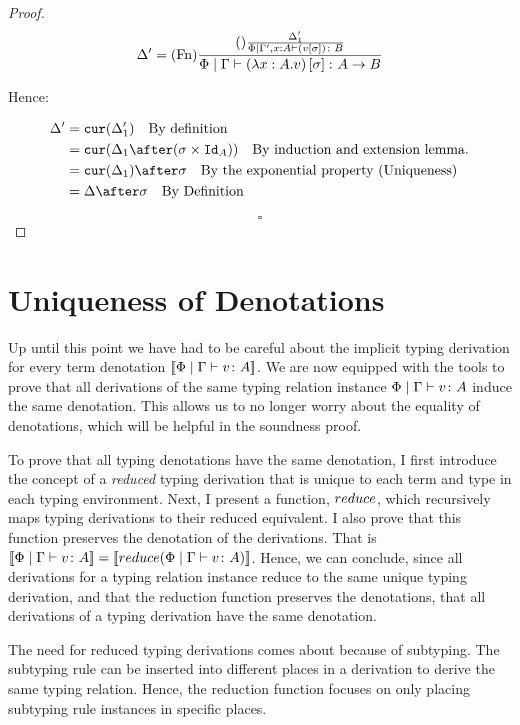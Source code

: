\documentclass{Report}
\begin{document}
\begin{proof}
\begin{equation}\label{TermSubLambdaPrime}
    \Delta' = (\text{Fn}) \frac{
        (\text{}) \frac{\Delta_1'}{\Phi\mid\Gamma', x:A \vdash (v\left[\sigma\right]) \colon B}
    }{\Phi\mid\Gamma \vdash (\lambda x : A. v)\left[\sigma\right] \colon A\rightarrow B}
\end{equation}


Hence:

\begin{align}
    \D' &= \cur{\D_1'}\qt{By definition}\\
        &= \cur{\D_1\after(\si\times\Id{A})}\qt{By induction and extension lemma.}\\
        & = \cur{\D_1}\after\si\qt{By the exponential property (Uniqueness)}\\
        &= \D\after\si\qt{By Definition}\\
\end{align}

$$\square$$
\end{proof}


\section{Uniqueness of Denotations}

Up until this point we have had to be careful about the implicit typing derivation for every term denotation ${\bf [\![}\Phi\mid\Gamma \vdash v \colon A{\bf ]\!]}$. We are now equipped with the tools to prove that all derivations of the same typing relation instance $\Phi\mid\Gamma \vdash v \colon A$ induce the same denotation. This allows us to no longer worry about the equality of denotations, which will be helpful in the soundness proof.

To prove that all typing denotations have the same denotation, I first introduce the concept of a \textit{reduced} typing derivation that is unique to each term and type in each typing environment. Next, I present a function, $reduce$, which recursively maps  typing derivations to their reduced equivalent. I also prove that this function preserves the denotation of the derivations. That is ${\bf [\![}\Phi\mid\Gamma \vdash v \colon A{\bf ]\!]} = {\bf [\![}reduce(\Phi\mid\Gamma \vdash v \colon A){\bf ]\!]}$. Hence, we can conclude, since all derivations for a typing relation instance reduce to the same unique typing derivation, and that the reduction function preserves the denotations, that all derivations of a typing derivation have the same denotation.

The need for reduced typing derivations comes about because of subtyping. The subtyping rule can be inserted into different places in a derivation to derive the same typing relation. Hence, the reduction function focuses on only placing subtyping rule instances in specific places. 
\end{document}
